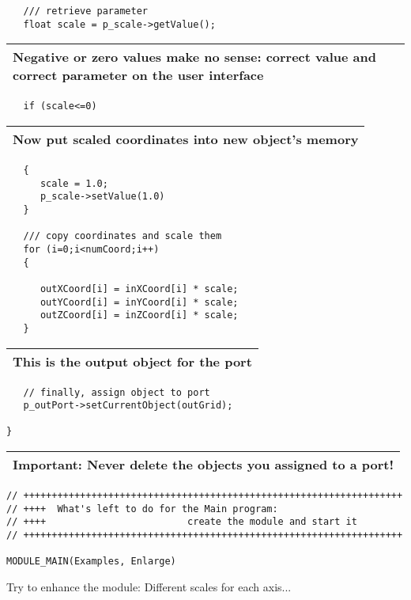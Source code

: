 \begin{verbatim}       
   /// retrieve parameter
   float scale = p_scale->getValue();
\end{verbatim}

\begin{longtable}{|p{12cm}|}
\hline
   {\bf Negative or zero values make no sense: correct value and correct parameter
   on the user interface} \\
\hline
\end{longtable}

\begin{verbatim}       
   if (scale<=0)
\end{verbatim}

\begin{longtable}{|l|}
\hline
   {\bf Now put scaled coordinates into new object's memory} \\
\hline
\end{longtable}

\begin{verbatim}       
   {
      scale = 1.0;
      p_scale->setValue(1.0)
   }
 
   /// copy coordinates and scale them
   for (i=0;i<numCoord;i++)
   {
       
      outXCoord[i] = inXCoord[i] * scale;
      outYCoord[i] = inYCoord[i] * scale;
      outZCoord[i] = inZCoord[i] * scale;
   }
\end{verbatim}

\begin{longtable}{|l|}
\hline
   {\bf This is the output object for the port } \\
\hline
\end{longtable}

\begin{verbatim}
   // finally, assign object to port
   p_outPort->setCurrentObject(outGrid);
   
} 
\end{verbatim}

\begin{longtable}{|l|}
\hline
   {\bf Important: Never delete the objects you assigned to a port!} \\
\hline
\end{longtable}

\begin{verbatim}     
// +++++++++++++++++++++++++++++++++++++++++++++++++++++++++++++++++++
// ++++  What's left to do for the Main program: 
// ++++                         create the module and start it 
// +++++++++++++++++++++++++++++++++++++++++++++++++++++++++++++++++++
 
MODULE_MAIN(Examples, Enlarge)
\end{verbatim}

Try to enhance the module: Different scales for each axis... 

